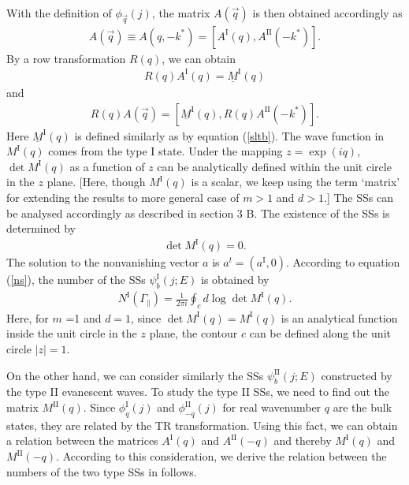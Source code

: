 \documentclass[aps,pra,amsmath,twocolumn,showpacs,bibnotes,10pt]{revtex4-1}
\begin{document}
With the definition of $\phi_{\vec q}(j)$, the matrix $A(\vec q)$ is then obtained accordingly as
\begin{eqnarray}
A(\vec q) \equiv A(q,-k^{\ast}) = [A^{\text{I}}(q),A^{\text{II}}(-k^{\ast})]. \label{a1}
\end{eqnarray}
By a row transformation $R(q)$, we can obtain
\begin{eqnarray}
R(q) A^{\text{I}}(q)= \underline M^{\text{I}}(q) \label{ra1}
\end{eqnarray}
and 
\begin{eqnarray}
R(q) A(\vec q) = [\underline M^{\text{I}}(q), R(q)A^{\text{II}}(-k^{\ast})]. \label{ra2}
\end{eqnarray}
Here $\underline M^{\text{I}}(q)$ is defined similarly as by equation (\ref{sltb}). The wave function in $M^{\text{I}}(q)$ comes from the type I state. Under the mapping $z = \exp(iq)$, $\det M^{\text{I}}(q)$ as a function of $z$ can be analytically defined within the unit circle in the $z$ plane. [Here, though $M^{\text{I}}(q)$ is a scalar, we keep using the term `matrix' for extending the results to more general case of $m > 1$ and $d > 1$.] The SSs can be analysed accordingly as described in section 3 B. The existence of the SSs is determined by
\begin{eqnarray}
\det M^{\text{I}}(q) = 0. \nonumber
\end{eqnarray}
The solution to the nonvanishing vector $a$ is $a^t = (a^{\text{I}},0)$. According to equation (\ref{ns}), the number of the SSs $\psi^{\text{I}}_b(j;E)$ is obtained by
\begin{eqnarray}
N^{\text{I}}(\Gamma_{\parallel}) = \frac{1}{2\pi i}\oint_{c}d\log \det M^{\text{I}}(q).  \label{ns1}
\end{eqnarray}
Here, for $m$ =1 and $d = 1$, since $\det M^{\text{I}}(q) = M^{\text{I}}(q)$ is an analytical function inside the unit circle in the $z$ plane, the contour $c$ can be defined along the unit circle $|z| = 1$.  
   
On the other hand, we can consider similarly the SSs $\psi^{\text {II}}_b(j;E)$ constructed by the type II evanescent waves. To study the type II SSs, we need to find out the matrix $M^{\text{II}}(q)$. Since $\phi^{\text{I}}_{q}(j)$ and $\phi^{\text{II}}_{-q}(j)$ for real wavenumber $q$ are the bulk states, they are related by the TR transformation. Using this fact, we can obtain a relation between the matrices $A^{\text{I}}(q)$ and $A^{\text{II}}(-q)$ and thereby $M^{\text{I}}(q)$ and $M^{\text{II}}(-q)$. According to this consideration, we derive the relation between the numbers of the two type SSs in follows. 
\end{document}
